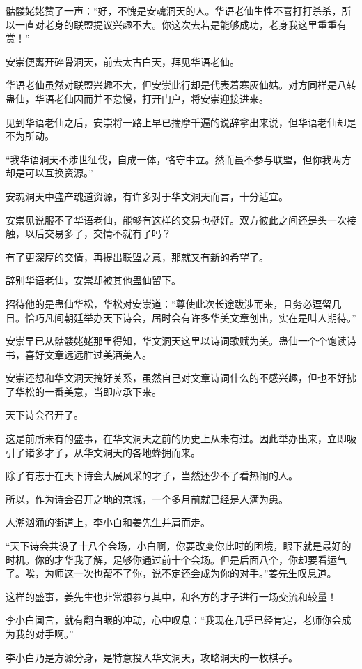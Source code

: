 \begin{this_body}
骷髅姥姥赞了一声：“好，不愧是安魂洞天的人。华语老仙生性不喜打打杀杀，所以一直对老身的联盟提议兴趣不大。你这次去若是能够成功，老身我这里重重有赏！”

安崇便离开碎骨洞天，前去太古白天，拜见华语老仙。

华语老仙虽然对联盟兴趣不大，但安崇此行却是代表着寒灰仙姑。对方同样是八转蛊仙，华语老仙因而并不怠慢，打开门户，将安崇迎接进来。

见到华语老仙之后，安崇将一路上早已揣摩千遍的说辞拿出来说，但华语老仙却是不为所动。

“我华语洞天不涉世征伐，自成一体，恪守中立。然而虽不参与联盟，但你我两方却是可以互换资源。”

安魂洞天中盛产魂道资源，有许多对于华文洞天而言，十分适宜。

安崇见说服不了华语老仙，能够有这样的交易也挺好。双方彼此之间还是头一次接触，以后交易多了，交情不就有了吗？

有了更深厚的交情，再提出联盟之意，那就又有新的希望了。

辞别华语老仙，安崇却被其他蛊仙留下。

招待他的是蛊仙华松，华松对安崇道：“尊使此次长途跋涉而来，且务必逗留几日。恰巧凡间朝廷举办天下诗会，届时会有许多华美文章创出，实在是叫人期待。”

安崇早已从骷髅姥姥那里得知，华文洞天这里以诗词歌赋为美。蛊仙一个个饱读诗书，喜好文章远远胜过美酒美人。

安崇还想和华文洞天搞好关系，虽然自己对文章诗词什么的不感兴趣，但也不好拂了华松的一番美意，当即应承下来。

天下诗会召开了。

这是前所未有的盛事，在华文洞天之前的历史上从未有过。因此举办出来，立即吸引了诸多才子，从华文洞天的各地蜂拥而来。

除了有志于在天下诗会大展风采的才子，当然还少不了看热闹的人。

所以，作为诗会召开之地的京城，一个多月前就已经是人满为患。

人潮汹涌的街道上，李小白和姜先生并肩而走。

“天下诗会共设了十八个会场，小白啊，你要改变你此时的困境，眼下就是最好的时机。你的才华我了解，足够你通过前十个会场。但是后面八个，你却要看运气了。唉，为师这一次也帮不了你，说不定还会成为你的对手。”姜先生叹息道。

这样的盛事，姜先生也非常想参与其中，和各方的才子进行一场交流和较量！

李小白闻言，就有翻白眼的冲动，心中叹息：“我现在几乎已经肯定，老师你会成为我的对手啊。”

李小白乃是方源分身，是特意投入华文洞天，攻略洞天的一枚棋子。


\end{this_body}
